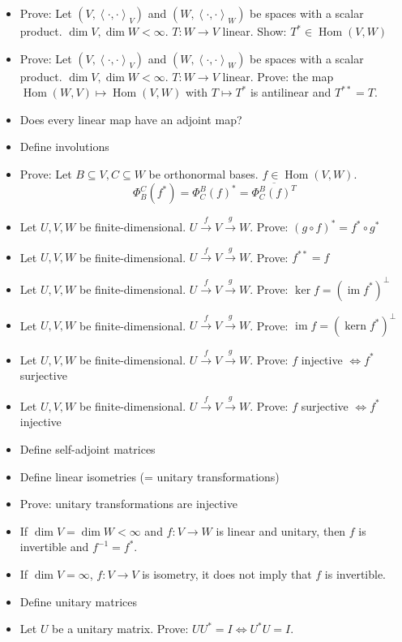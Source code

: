\documentclass[a4paper]{article}
\newcommand{\ip}[2]{\left\langle#1,#2\right\rangle} %
\DeclareMathOperator{\im}{im}
\DeclareMathOperator{\ke}{kern}
\begin{document}
\begin{itemize}
  \item Prove: Let $(V, \ip{\cdot}{\cdot}_V)$ and $(W, \ip{\cdot}{\cdot}_W)$ be spaces with a scalar product. $\dim{V}, \dim{W} < \infty$.
    $T: W \to V$ linear. Show: $T^* \in \operatorname{Hom}(V, W)$
  \item Prove: Let $(V, \ip{\cdot}{\cdot}_V)$ and $(W, \ip{\cdot}{\cdot}_W)$ be spaces with a scalar product. $\dim{V}, \dim{W} < \infty$.
    $T: W \to V$ linear. Prove: the map $\operatorname{Hom}(W, V) \mapsto \operatorname{Hom}(V, W)$ with $T \mapsto T^*$ is antilinear and $T^{**} = T$.
  \item Does every linear map have an adjoint map?
  \item Define involutions
  \item Prove: Let $B \subseteq V, C \subseteq W$ be orthonormal bases. $f \in \operatorname{Hom}(V, W)$.
    \[ \Phi_B^C(f^*) = \Phi_C^B(f)^* = \overline{\Phi_C^B(f)^T} \]
  \item Let $U, V, W$ be finite-dimensional. $U \xrightarrow f V \xrightarrow g W$. Prove: $(g \circ f)^* = f^* \circ g^*$
  \item Let $U, V, W$ be finite-dimensional. $U \xrightarrow f V \xrightarrow g W$. Prove: $f^{**} = f$
  \item Let $U, V, W$ be finite-dimensional. $U \xrightarrow f V \xrightarrow g W$. Prove: $\ker{f} = (\im{f^*})^\bot$
  \item Let $U, V, W$ be finite-dimensional. $U \xrightarrow f V \xrightarrow g W$. Prove: $\im{f} = (\ke{f^*})^\bot$
  \item Let $U, V, W$ be finite-dimensional. $U \xrightarrow f V \xrightarrow g W$. Prove: $f$ injective $\iff f^*$ surjective
  \item Let $U, V, W$ be finite-dimensional. $U \xrightarrow f V \xrightarrow g W$. Prove: $f$ surjective $\iff f^*$ injective
  \item Define self-adjoint matrices
  \item Define linear isometries (= unitary transformations)
  \item Prove: unitary transformations are injective
  \item If $\dim{V} = \dim{W} < \infty$ and $f: V \to W$ is linear and unitary, then $f$ is invertible and $f^{-1} = f^*$.
  \item If $\dim{V} = \infty$, $f: V \to V$ is isometry, it does not imply that $f$ is invertible.
  \item Define unitary matrices
  \item Let $U$ be a unitary matrix. Prove: $UU^* = I \iff U^* U = I$.

\end{itemize}
\end{document}
